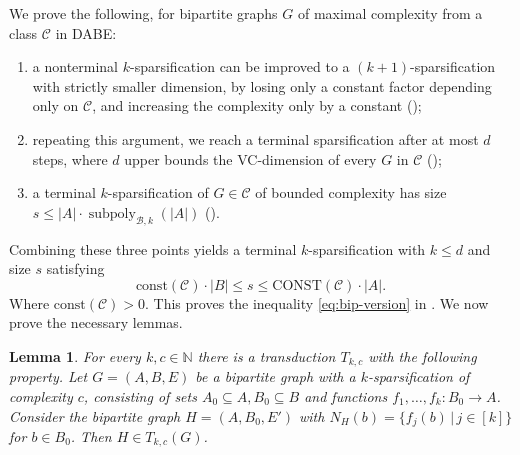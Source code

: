 \documentclass[11pt]{article}
\newtheorem{lemma}{Lemma}
\theoremstyle{definition}
\newcommand{\CC}{{\mathscr C}}
\newcommand{\BB}{{\mathscr B}}
\newcommand{\N}{\mathbb{N}}
\renewcommand{\le}{\leqslant}
\newcommand{\set}[1]{\{#1\}}
\newcommand{\setof}[2]{\set{#1 \,|\, #2 }}
\newcommand{\from}{\colon}
\DeclareMathOperator{\subpoly}{subpoly}
\begin{document}
We prove the following, for bipartite graphs $G$ of maximal complexity from a class $\CC$ in DABE:
\begin{enumerate}
  \item a nonterminal $k$-sparsification can be improved to a $(k+1)$-sparsification with strictly smaller dimension, by losing only a constant factor depending only on $\CC$, and increasing the complexity only by a constant ();
  \item repeating this argument, we reach a terminal sparsification after at most $d$ steps, where $d$ upper bounds the VC-dimension of every $G$ in $\CC$ ();
  \item  a terminal $k$-sparsification of $G\in \CC$ of bounded complexity has size $s\le |A|\cdot \subpoly_{\BB,k}(|A|)$ ().
\end{enumerate}
Combining these three points yields a terminal $k$-sparsification with $k\le d$ and size $s$ satisfying
$$\text{const}(\CC) \cdot |B| \le s \le \text{CONST}(\CC) \cdot |A|.$$
Where $\text{const}(\CC) > 0$.
This proves the inequality \eqref{eq:bip-version} in . We now prove the necessary lemmas.


\begin{lemma}\label{lem:transduce}
  For every $k,c\in\N$ there is a transduction $T_{k,c}$ with the following property.
  Let $G=(A,B,E)$ be a bipartite graph with a $k$-sparsification 
   of complexity $c$, consisting of sets 
   $A_0\subseteq A,B_0\subseteq B$ and functions $f_1,\ldots,f_k\from B_0\to A$.
   Consider the bipartite graph $H=(A,B_0,E')$
with $N_H(b)=\setof{f_j(b)}{j\in[k]}$ for $b\in B_0$.
Then $H\in T_{k,c}(G)$.
\end{lemma}
\end{document}
